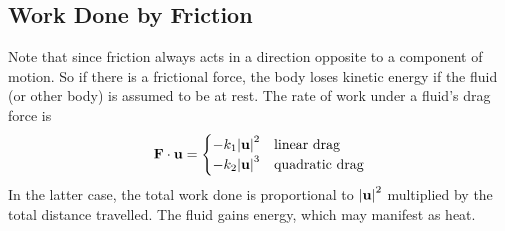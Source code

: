 \documentclass{article}
\begin{document}
\subsection{Work Done by Friction}
Note that since friction always acts in a direction opposite to a component of motion. So if there is a frictional force, the body loses kinetic energy if the fluid (or other body) is assumed to be at rest. The rate of work under a fluid's drag force is
\[ \vb F \cdot \vb u = \begin{cases}
        -k_1 \abs{\vb u}^2 & \text{linear drag}    \\
        -k_2 \abs{\vb u}^3 & \text{quadratic drag}
    \end{cases} \]
In the latter case, the total work done is proportional to $\abs{\vb u}^2$ multiplied by the total distance travelled. The fluid gains energy, which may manifest as heat.
\end{document}

